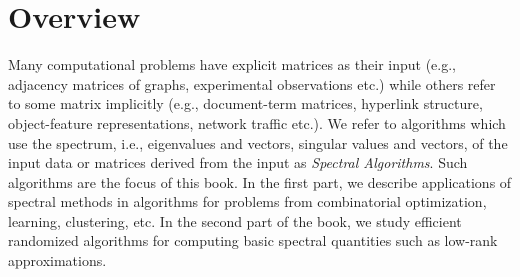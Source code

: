 \documentclass{book}
\numberwithin{exercise}{chapter}
\begin{document}
\newcommand{\ooi}{(1+o(1))}
\newcommand{\ul}[1]{\mbox{\boldmath$#1$}}
\newcommand{\wh}[1]{\widehat{#1}}
\newcommand{\Poly}{{\mathop{\rm poly}\nolimits}}
\newcommand{\mx}{{\mu}}       %


\newcommand{\rdup}[1]{{\lceil #1 \rceil }}
\newcommand{\rdown}[1]{{\lfloor #1 \rfloor}}

\newcommand{\brac}[1]{\left(#1\right)}
\newcommand{\sbrac}[1]{\left({\scriptstyle #1}\right)}
\newcommand{\tbrac}[1]{\left({\textstyle #1}\right)}
\newcommand{\smorl}[1]{{\scriptstyle #1}}
\newcommand{\sbfrac}[2]{\left(\frac{\scriptstyle #1}{\scriptstyle #2}\right)}
\newcommand{\sfrac}[2]{\frac{\scriptstyle #1}{\scriptstyle #2}}
\newcommand{\bfrac}[2]{\left(\frac{#1}{#2}\right)}
\def\half{\sfrac{1}{2}}
\def\tO{\tilde{O}}
\newcommand{\rai}{\rightarrow \infty}
\newcommand{\ra}{\rightarrow}


\def\Inf{\hbox{Inf}}
\def\sm{\setminus}
\def\seq{\subseteq}
\def\es{\emptyset}
\newcommand{\ind}[1]{\mbox{{\large 1}} \{#1\}}

\def\E{\hbox{{\sf E}\;}}
\def\Pr{\mbox{{\bf Pr}}}
\def\whp{\mbox{${\bf whp}\;$}}
\def\Max{\hbox{MAX}}
\def\OPT{{\bf OPT}}
\def\tr{\hbox{Tr}}
\def\vol{\mbox{Vol}}
\def\lnorm{\left| \left| }
\def\rnorm{\right| \right|}
\def\var{\hbox{\sf Var\;}}
\newcommand{\wt}{w}    %





\mainmatter

%
%



\chapter*{Overview}

\def\dist{\hbox{dist}}
\newcommand{\magn}[1]{\|#1\|}

Many computational
problems have explicit matrices as their input (e.g., adjacency matrices of graphs, experimental observations etc.)
while others refer to some matrix implicitly (e.g., document-term matrices, hyperlink structure,
object-feature representations, network traffic etc.).
We refer to algorithms which use the spectrum, i.e., eigenvalues and vectors, singular values and
vectors, of the input data or matrices derived from the input as {\em Spectral Algorithms}.
Such algorithms are the focus of this book. In the first part, we
describe applications of spectral methods in algorithms for problems from combinatorial optimization,
learning, clustering, etc. In the second part of the book, we study efficient randomized algorithms for computing basic spectral quantities such as low-rank approximations.
\end{document}
